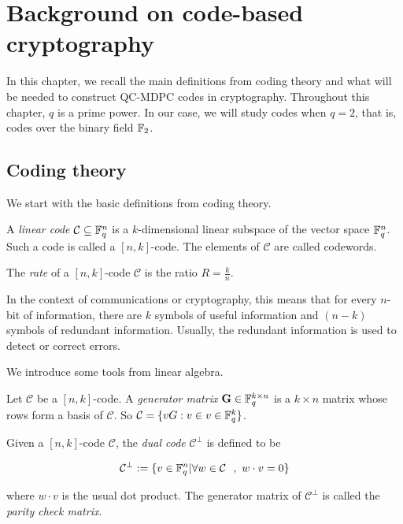 \section{Background on code-based cryptography}

In this chapter, we recall the main definitions from coding theory and what will be needed to construct QC-MDPC codes in cryptography. Throughout this chapter, $q$ is a prime power. In our case, we will study codes when $q=2$, that is, codes over the binary field $\mathbb{F}_2$.

\subsection{Coding theory}
We start with the basic definitions from coding theory.

\begin{defn}
A \textit{linear code} $\mathcal{C} \subseteq \mathbb{F}_q^n$ is a $k$-dimensional linear subspace of the vector space $\mathbb{F}_q^n$. Such a code is called a $[n,k]$-code. The elements of $\mathcal{C}$ are called codewords.
\end{defn}

\begin{defn}
The \textit{rate} of a $[n,k]$-code $\mathcal{C}$ is the ratio $ R = \frac{k}{n}$.

In the context of communications or cryptography, this means that for every $n$-bit of information, there are $k$ symbols of useful information and $(n-k)$ symbols of redundant information. Usually, the redundant information is used to detect or correct errors.
\end{defn}

We introduce some tools from linear algebra.

\begin{defn}
Let $\mathcal{C}$ be a $[n,k]$-code. A \textit{generator matrix} $\mathbf{G} \in \mathbb{F}_q^{k \times n}$ is a $k \times n$ matrix whose rows form a basis of $\mathcal{C}$. So $\mathcal{C} = \{ vG: v \in v \in \mathbb{F}_q^k\}$.
\end{defn}

\begin{defn}
Given a $[n,k]$-code $\mathcal{C}$, the \textit{dual code} $\mathcal{C}^\perp$ is defined to be

\[
\mathcal{C}^\perp := \{ v \in \mathbb{F}_q^n | \forall w \in \mathcal{C} \ \ , \ w \cdot v = 0 \}   
\]

where $ w \cdot v $ is the usual dot product. The generator matrix of $\mathcal{C}^\perp$ is called the \textit{parity check matrix}.
\end{defn}

